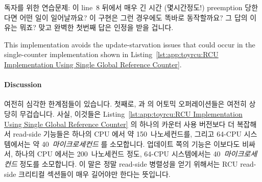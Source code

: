 {	독자를 위한 연습문제:  이 line~8 뒤에서 매우 긴
	시간 (몇시간정도!) preemption 당한다면 어떤 일이 일어날까요?
	이 구현은 그런 경우에도 똑바로 동작할까요?
	그 답의 이유는 뭐죠?
	맞고 완벽한 첫번째 답은 인정을 받을 겁니다.
	\iffalse

	Exercise for the reader: What happens if \co{rcu_read_lock()}
	is preempted for a very long time (hours!) just after
	line~8?
	Does this implementation operate correctly in that case?
	Why or why not?
	The first correct and complete response will be credited.
	\fi
} \QuickQuizEnd
\iffalse

이 구현은
Listing~\ref{lst:app:toyrcu:RCU Implementation Using Single Global Reference Counter}
에서 보인 단일 카운터 구현에서 일어날 수 있는
업데이트 쪽의 starvation 문제를 배제합니다.
\fi

This implementation avoids the update-starvation issues that could
occur in the single-counter implementation shown in
Listing~\ref{lst:app:toyrcu:RCU Implementation Using Single Global Reference Counter}.

\paragraph{Discussion}

여전히 심각한 한계점들이 있습니다.
첫째로,  과  의 어토믹 오퍼레이션들은
여전히 상당히 무겁습니다.
사실, 이것들은
Listing~\ref{lst:app:toyrcu:RCU Implementation Using Single Global Reference Counter}
의 하나의 카운터 사용 버전보다 더 복잡해서 read-side 기능들은 하나의 
CPU 에서 약 150~나노세컨드를, 그리고 64-CPU 시스템에서는 약
40~\emph{마이크로세컨드} 를 소모합니다.
업데이트 쪽의  기능은 이보다도 비싸서, 하나의 
CPU 에서는 200~나노세컨드 정도, 64-CPU 시스템에서는 40~\emph{마이크로세컨드}
정도를 소모합니다.
이 말은 정말 read-side 병렬성을 얻기 위해서는 RCU read-side 크리티컬 섹션들이
매우 길어야만 한다는 뜻입니다.
\iffalse

There are still some serious shortcomings.
First, the atomic operations in \co{rcu_read_lock()}
and \co{rcu_read_unlock()}
are still quite heavyweight.
In fact, they are more complex than those
of the single-counter variant shown in
Listing~\ref{lst:app:toyrcu:RCU Implementation Using Single Global Reference Counter},
with the read-side primitives consuming about 150~nanoseconds on a single
\Power{5} CPU and almost 40~\emph{microseconds} on a 64-CPU system.
The update-side \co{synchronize_rcu()} primitive is more costly as
well, ranging from about 200~nanoseconds on a single \Power{5} CPU to
more than 40~\emph{microseconds} on a 64-CPU system.
This means that the RCU read-side critical sections
have to be extremely long in order to get any real
read-side parallelism.
\fi

